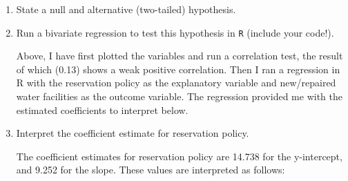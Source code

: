 \documentclass[12pt,letterpaper]{article}
\begin{document}
\newpage
\begin{enumerate}
	\item [(a)] State a null and alternative (two-tailed) hypothesis. 
		
	\vspace{2cm}
	\item [(b)] Run a bivariate regression to test this hypothesis in \texttt{R} (include your code!).
		
		Above, I have first plotted the variables and run a correlation test, the result of which (0.13) shows a weak positive correlation. Then I ran a regression in R with the reservation policy as the explanatory variable and new/repaired water facilities as the outcome variable. The regression provided me with the estimated coefficients to interpret below. 
	\vspace{1cm}
	\item [(c)] Interpret the coefficient estimate for reservation policy.  
		\vspace{.5cm}
	
	The coefficient estimates for reservation policy are 14.738 for the y-intercept, and 9.252 for the slope. These values are interpreted as follows:
	
		
		
\end{enumerate}


\end{document}
